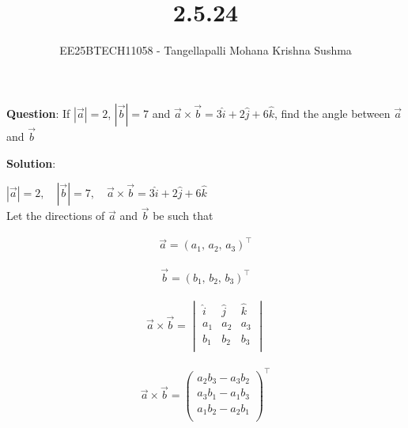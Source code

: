 \documentclass[journal]{IEEEtran}
\begin{document}

\vspace{3cm}

\title{2.5.24}
\author{EE25BTECH11058 - Tangellapalli Mohana Krishna Sushma}
{\let\newpage\relax\maketitle}

\renewcommand{\thefigure}{\theenumi}
\renewcommand{\thetable}{\theenumi}
\setlength{\intextsep}{10pt} %
\textbf{Question}:
If $|\vec{a}| = 2$, $|\vec{b}| = 7$ and $\vec{a} \times \vec{b} = 3 \hat{i} + 2 \hat{j} + 6 \hat{k}$, find the angle between $\vec{a}$ and $\vec{b}$
\bigskip

\textbf{Solution}:
\begin{center}
$|\vec{a}| = 2, \quad |\vec{b}| = 7, \quad \vec{a} \times \vec{b} = 3\hat{i} + 2\hat{j} + 6\hat{k}$
\\[1em]
Let the directions of $\vec{a}$ and $\vec{b}$ be such that
\end{center}

\begin{flushleft}

\begin{align}
\vec{a} = (a_1,\, a_2,\, a_3)^{\top}
\end{align}

\begin{align}
\vec{b} = (b_1,\, b_2,\, b_3)^{\top}
\end{align}

\end{flushleft}

\begin{align}
\vec{a} \times \vec{b} =
\begin{vmatrix}
\hat{i} & \hat{j} & \hat{k} \\
a_1 & a_2 & a_3 \\
b_1 & b_2 & b_3 \\
\end{vmatrix}
\end{align}

\begin{align}
\vec{a} \times \vec{b} =
\begin{pmatrix}
a_2 b_3 - a_3 b_2 \\
a_3 b_1 - a_1 b_3 \\
a_1 b_2 - a_2 b_1 \\
\end{pmatrix}^{\top}
\end{align}
\end{document}
